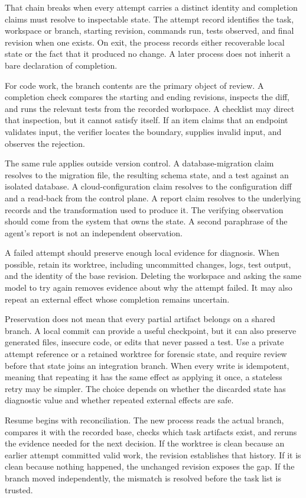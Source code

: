 That chain breaks when every attempt carries a distinct identity and completion claims must resolve to inspectable state. The attempt record identifies the task, workspace or branch, starting revision, commands run, tests observed, and final revision when one exists. On exit, the process records either recoverable local state or the fact that it produced no change. A later process does not inherit a bare declaration of completion.

For code work, the branch contents are the primary object of review. A completion check compares the starting and ending revisions, inspects the diff, and runs the relevant tests from the recorded workspace. A checklist may direct that inspection, but it cannot satisfy itself. If an item claims that an endpoint validates input, the verifier locates the boundary, supplies invalid input, and observes the rejection.

The same rule applies outside version control. A database-migration claim resolves to the migration file, the resulting schema state, and a test against an isolated database. A cloud-configuration claim resolves to the configuration diff and a read-back from the control plane. A report claim resolves to the underlying records and the transformation used to produce it. The verifying observation should come from the system that owns the state. A second paraphrase of the agent's report is not an independent observation.

A failed attempt should preserve enough local evidence for diagnosis. When possible, retain its worktree, including uncommitted changes, logs, test output, and the identity of the base revision. Deleting the workspace and asking the same model to try again removes evidence about why the attempt failed. It may also repeat an external effect whose completion remains uncertain.

Preservation does not mean that every partial artifact belongs on a shared branch. A local commit can provide a useful checkpoint, but it can also preserve generated files, insecure code, or edits that never passed a test. Use a private attempt reference or a retained worktree for forensic state, and require review before that state joins an integration branch. When every write is idempotent, meaning that repeating it has the same effect as applying it once, a stateless retry may be simpler. The choice depends on whether the discarded state has diagnostic value and whether repeated external effects are safe.

Resume begins with reconciliation. The new process reads the actual branch, compares it with the recorded base, checks which task artifacts exist, and reruns the evidence needed for the next decision. If the worktree is clean because an earlier attempt committed valid work, the revision establishes that history. If it is clean because nothing happened, the unchanged revision exposes the gap. If the branch moved independently, the mismatch is resolved before the task list is trusted.

